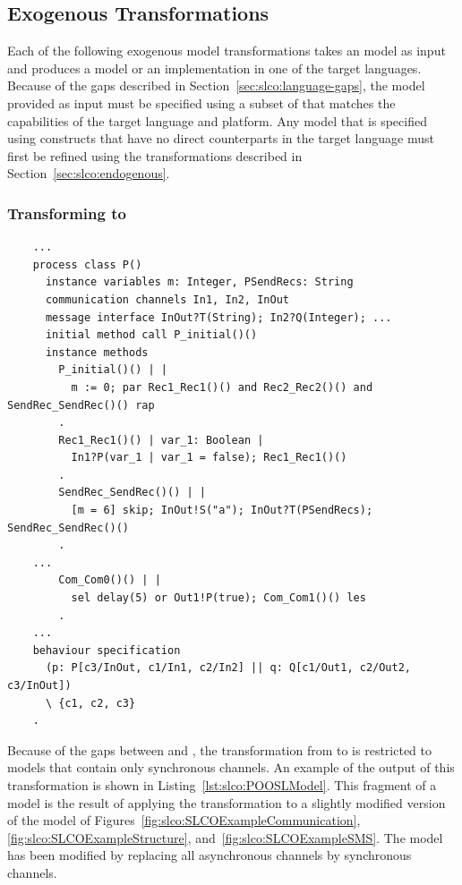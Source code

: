 \subsection{Exogenous Transformations}
\label{sec:slco:exogenous}
Each of the following exogenous model transformations takes an \SLCO model as input and produces a model or an implementation in one of the target languages.
Because of the gaps described in Section~\ref{sec:slco:language-gaps}, the \SLCO model provided as input must be specified using a subset of \SLCO that matches the capabilities of the target language and platform.
Any model that is specified using constructs that have no direct counterparts in the target language must first be refined using the transformations described in Section~\ref{sec:slco:endogenous}.

\subsubsection{Transforming \SLCO to \POOSL}
\label{sec:slco:transformation-to-poosl}

\begin{listing}
  \lstset{
    language=poosl,
    label=lst:slco:POOSLModel,
    caption=Part of a \POOSL model,
    numbers=left
  }
  \begin{lstlisting}
    ...
    process class P()
      instance variables m: Integer, PSendRecs: String
      communication channels In1, In2, InOut
      message interface InOut?T(String); In2?Q(Integer); ...
      initial method call P_initial()()
      instance methods
        P_initial()() | |
          m := 0; par Rec1_Rec1()() and Rec2_Rec2()() and SendRec_SendRec()() rap
        .
        Rec1_Rec1()() | var_1: Boolean |
          In1?P(var_1 | var_1 = false); Rec1_Rec1()()
        .
        SendRec_SendRec()() | |
          [m = 6] skip; InOut!S("a"); InOut?T(PSendRecs); SendRec_SendRec()()
        .
    ...
        Com_Com0()() | |
          sel delay(5) or Out1!P(true); Com_Com1()() les
        .
    ...
    behaviour specification
      (p: P[c3/InOut, c1/In1, c2/In2] || q: Q[c1/Out1, c2/Out2, c3/InOut])
      \ {c1, c2, c3}
    .
  \end{lstlisting}
\end{listing}

Because of the gaps between \SLCO and \POOSL, the transformation from \SLCO to \POOSL is restricted to models that contain only synchronous channels.
An example of the output of this transformation is shown in Listing~\ref{lst:slco:POOSLModel}.
This fragment of a \POOSL model is the result of applying the transformation to a slightly modified version of the model of Figures~\ref{fig:slco:SLCOExampleCommunication}, \ref{fig:slco:SLCOExampleStructure}, and~\ref{fig:slco:SLCOExampleSMS}.
The model has been modified by replacing all asynchronous channels by synchronous channels.

